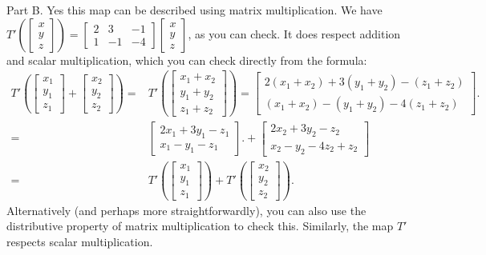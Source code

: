 \begin{SaveQuestion}
    Part B.
    Yes this map can be described using matrix multiplication. We have $T'( \begin{bmatrix}x\\y \\z \end{bmatrix}) = \begin{bmatrix} 2 &  3 &  - 1 \\ 1 & -1 & -4\end{bmatrix}\begin{bmatrix}x\\y \\z \end{bmatrix}$, as you can check. It does respect addition and scalar multiplication, which you can check directly from the formula:
		$$
		\begin{aligned}
		T'( \begin{bmatrix}x_1\\y_1 \\z_1 \end{bmatrix} +  \begin{bmatrix}x_2\\y_2 \\z_2 \end{bmatrix}) =& T'( \begin{bmatrix}x_1 +x_2\\y_1+y_2 \\z_1+z_2 \end{bmatrix} ) 
		= 
		\begin{bmatrix} 2(x_1+x_2) + 3(y_1+y_2) -(z_1+z_2)\\ (x_1+x_2) -(y_1+y_2)-4(z_1+z_2)\end{bmatrix}. \\ = &   
		\begin{bmatrix} 2x_1+ 3y_1 - z_1 \\ x_1 -y_1-z_1\end{bmatrix}. +  \begin{bmatrix} 2x_2 + 3y_2 -z_2\\ x_2 -y_2-4z_2+z_2\end{bmatrix} \\ =&
		T'(\begin{bmatrix}x_1\\y_1 \\z_1 \end{bmatrix}) + T'( \begin{bmatrix}x_2\\y_2 \\z_2 \end{bmatrix}).
		\end{aligned}$$
		Alternatively (and perhaps more straightforwardly), you can also use the distributive property of matrix multiplication to check this.
		Similarly, the map $T'$ respects scalar multiplication.
\end{SaveQuestion}


